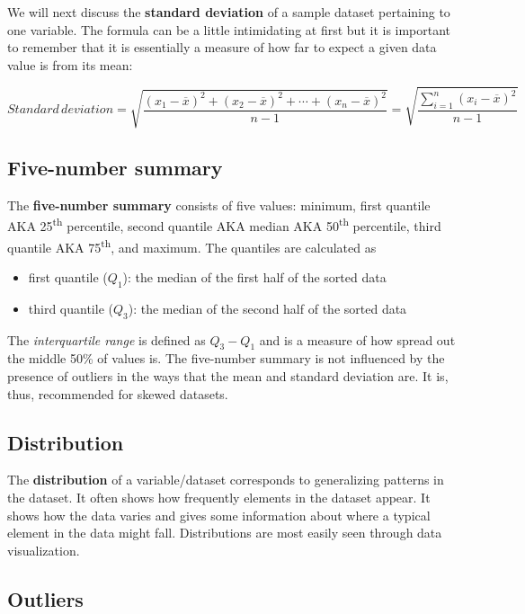 \documentclass[
  letterpaper,
  DIV=11,
  numbers=noendperiod]{scrreprt}
\providecommand{\tightlist}{%
  \setlength{\itemsep}{0pt}\setlength{\parskip}{0pt}}\usepackage{longtable,booktabs,array}
\theoremstyle{definition}
\theoremstyle{remark}
\begin{document}
We will next discuss the \textbf{standard deviation} of a sample dataset
pertaining to one variable. The formula can be a little intimidating at
first but it is important to remember that it is essentially a measure
of how far to expect a given data value is from its mean:

\[Standard \, deviation = \sqrt{\frac{(x_1 - \overline{x})^2 + (x_2 - \overline{x})^2 + \cdots + (x_n - \overline{x})^2}{n - 1}} = \sqrt{\frac{\sum_{i= 1}^n(x_i - \overline{x})^2 }{n - 1}}\]

\hypertarget{five-number-summary}{%
\subsection{Five-number summary}\label{five-number-summary}}

The \textbf{five-number summary} consists of five values: minimum, first
quantile AKA 25\textsuperscript{th} percentile, second quantile AKA
median AKA 50\textsuperscript{th} percentile, third quantile AKA
75\textsuperscript{th}, and maximum. The quantiles are calculated as

\begin{itemize}
\tightlist
\item
  first quantile (\(Q_1\)): the median of the first half of the sorted
  data
\item
  third quantile (\(Q_3\)): the median of the second half of the sorted
  data
\end{itemize}

The \emph{interquartile range} is defined as \(Q_3 - Q_1\) and is a
measure of how spread out the middle 50\% of values is. The five-number
summary is not influenced by the presence of outliers in the ways that
the mean and standard deviation are. It is, thus, recommended for skewed
datasets.

\hypertarget{distribution}{%
\subsection{Distribution}\label{distribution}}

The \textbf{distribution} of a variable/dataset corresponds to
generalizing patterns in the dataset. It often shows how frequently
elements in the dataset appear. It shows how the data varies and gives
some information about where a typical element in the data might fall.
Distributions are most easily seen through data visualization.

\hypertarget{outliers}{%
\subsection{Outliers}\label{outliers}}
\end{document}

